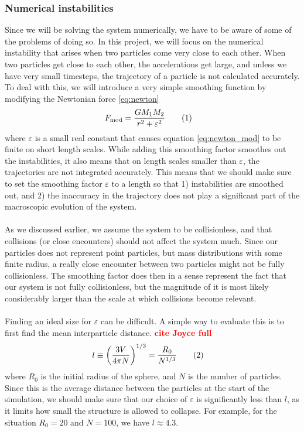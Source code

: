 \documentclass{article}
\newcommand\red[1]{\textcolor{red}{\textbf{#1}}}
\newcommand\numberthis{\addtocounter{equation}{1}\tag{\theequation}}
\begin{document}
\subsubsection{Numerical instabilities}
Since we will be solving the system numerically, we have to be aware of some of the problems of doing so. In this project, we will focus on the numerical instability that arises when two particles come very close to each other. When two particles get close to each other, the accelerations get large, and unless we have very small timesteps, the trajectory of a particle is not calculated accurately. To deal with this, we will introduce a very simple smoothing function by modifying the Newtonian force \eqref{eq:newton}
\begin{align*}
  F_{\text{mod}} &= \frac{GM_1M_2}{r^2 + \varepsilon^2} \numberthis\label{eq:newton_mod}
\end{align*}
where $\varepsilon$ is a small real constant that causes equation \eqref{eq:newton_mod} to be finite on short length scales. While adding this smoothing factor smoothes out the instabilities, it also means that on length scales smaller than $\varepsilon$, the trajectories are not integrated accurately. This means that we should make sure to set the smoothing factor $\varepsilon$ to a length so that 1) instabilities are smoothed out, and 2) the inaccuracy in the trajectory does not play a significant part of the macroscopic evolution of the system.\\\\
As we discussed earlier, we assume the system to be collisionless, and that collisions (or close encounters) should not affect the system much. Since our particles does not represent point particles, but mass distributions with some finite radius, a really close encounter between two particles might not be fully collisionless. The smoothing factor does then in a sense represent the fact that our system is not fully collisionless, but the magnitude of it is most likely considerably larger than the scale at which collisions become relevant.\\\\
Finding an ideal size for $\varepsilon$ can be difficult. A simple way to evaluate this is to first find the mean interparticle distance. \red{cite Joyce full}
\begin{align*}
  l &\equiv \bigg(\frac{3V}{4\pi N}\bigg)^{1/3} = \frac{R_0}{N^{1/3}} \numberthis\label{eq:mean_dist}
\end{align*}
where $R_0$ is the initial radius of the sphere, and $N$ is the number of particles. Since this is the average distance between the particles at the start of the simulation, we should make sure that our choice of $\varepsilon$ is significantly less than $l$, as it limits how small the structure is allowed to collapse. For example, for the situation $R_0 = 20$ and $N = 100$, we have $l \approx 4.3$.
\end{document}
